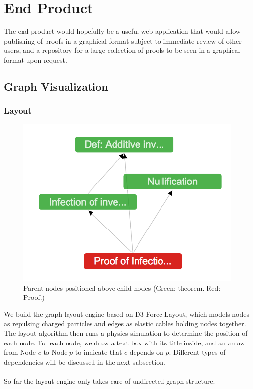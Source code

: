 \documentclass{acm_proc_article-sp}
\begin{document}
\section{End Product}
The end product would hopefully be a useful web application that would
allow publishing of proofs in a graphical format subject to immediate review
of other users, and a repository for a large collection of proofs to be
seen in a graphical format upon request.
\subsection{Graph Visualization}
\subsubsection{Layout}
\begin{figure}[h!]
\centering
\includegraphics[scale=0.3]{layout_1.png}
\caption{Parent nodes positioned above child nodes (Green: theorem. Red: Proof.)}
\end{figure}
We build the graph layout engine based on D3 Force Layout, which models nodes as repulsing charged particles and edges as elastic cables holding nodes together. The layout algorithm then runs a physics simulation to determine the position of each node.
For each node, we draw a text box with its title inside,
and an arrow from Node $c$ to Node $p$ to indicate that $c$ depends on $p$. Different types of dependencies will be discussed in the next subsection.\\\\
So far the layout engine only takes care of undirected graph structure. 
\end{document}
